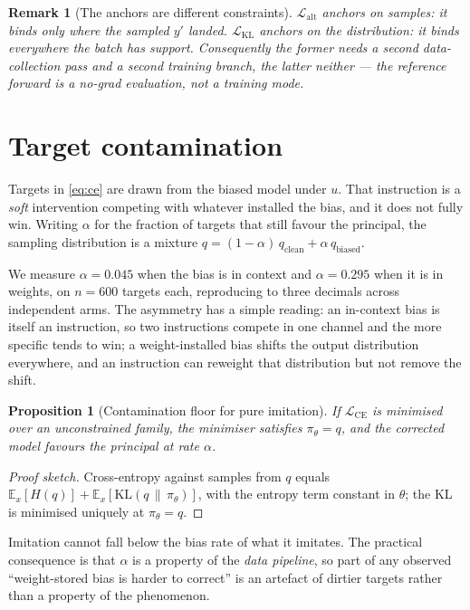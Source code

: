 \documentclass{article}
\newtheorem{proposition}{Proposition}
\newtheorem{remark}{Remark}
\newcommand{\KL}{\mathrm{KL}}
\begin{document}
\begin{remark}[The anchors are different constraints]
\label{rem:anchors}
$\mathcal{L}_{\mathrm{alt}}$ anchors on \emph{samples}: it binds only where the
sampled $y'$ landed. $\mathcal{L}_{\mathrm{KL}}$ anchors on the
\emph{distribution}: it binds everywhere the batch has support. Consequently the
former needs a second data-collection pass and a second training branch, the
latter neither --- the reference forward is a no-grad evaluation, not a training
mode.
\end{remark}

\section{Target contamination}
\label{sec:contamination}

Targets in \eqref{eq:ce} are drawn from the biased model under $u$. That
instruction is a \emph{soft} intervention competing with whatever installed the
bias, and it does not fully win. Writing $\alpha$ for the fraction of targets
that still favour the principal, the sampling distribution is a mixture
$q = (1-\alpha)\,q_{\mathrm{clean}} + \alpha\, q_{\mathrm{biased}}$.

We measure $\alpha = 0.045$ when the bias is in context and $\alpha = 0.295$
when it is in weights, on $n=600$ targets each, reproducing to three decimals
across independent arms. The asymmetry has a simple reading: an in-context bias
is itself an instruction, so two instructions compete in one channel and the
more specific tends to win; a weight-installed bias shifts the output
distribution everywhere, and an instruction can reweight that distribution but
not remove the shift.

\begin{proposition}[Contamination floor for pure imitation]
\label{prop:floor}
If $\mathcal{L}_{\mathrm{CE}}$ is minimised over an unconstrained family, the
minimiser satisfies $\pi_\theta = q$, and the corrected model favours the
principal at rate $\alpha$.
\end{proposition}

\begin{proof}[Proof sketch]
Cross-entropy against samples from $q$ equals $\mathbb{E}_x[H(q)] +
\mathbb{E}_x[\KL(q \,\|\, \pi_\theta)]$, with the entropy term constant in
$\theta$; the KL is minimised uniquely at $\pi_\theta = q$.
\end{proof}

Imitation cannot fall below the bias rate of what it imitates. The practical
consequence is that $\alpha$ is a property of the \emph{data pipeline}, so part
of any observed ``weight-stored bias is harder to correct'' is an artefact of
dirtier targets rather than a property of the phenomenon.
\end{document}

